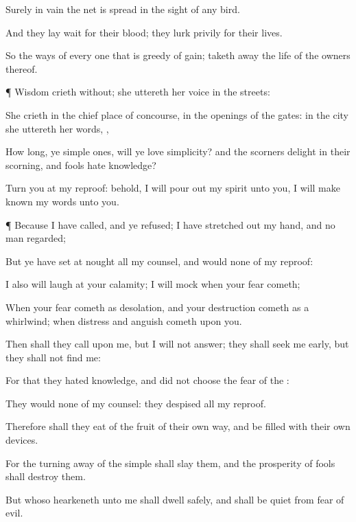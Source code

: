 {Surely in
vain the
net is
spread in the
sight of any
bird.

And they lay
wait for their
{}
blood; they lurk
privily for their
{}
lives.

So
{} the
ways of every one that is
greedy of
gain;
{} taketh
away the
life of the
owners thereof.


\par }{\PP {}¶
Wisdom
crieth
without; she
uttereth her
voice in the
streets:

She
crieth in the chief
place of
concourse, in the
openings of the
gates: in the
city she
uttereth her
words,
{},

How long, ye simple
ones, will ye
love
simplicity? and the
scorners
delight in their
scorning, and
fools
hate
knowledge?

Turn you at my
reproof: behold, I will pour
out my
spirit unto you, I will make
known my
words unto you.


\par }{\PP {}¶ Because I have
called, and ye
refused; I have stretched
out my
hand, and no man
regarded;

But ye have set at
nought all my
counsel, and
would none of my
reproof:

I also will
laugh at your
calamity; I will
mock when your
fear
cometh;

When your
fear
cometh as
desolation, and your
destruction
cometh as a
whirlwind; when
distress and
anguish
cometh upon you.

Then shall they
call upon me, but I will not
answer; they shall seek me
early, but they shall not
find me:

For that they
hated
knowledge, and did not
choose the
fear of the
{}:

They
would none of my
counsel: they
despised all my
reproof.

Therefore shall they
eat of the
fruit of their own
way, and be
filled with their own
devices.

For the turning
away of the
simple shall
slay them, and the
prosperity of
fools shall
destroy them.

But whoso
hearkeneth unto me shall
dwell
safely, and shall be
quiet from
fear of
evil.




}
